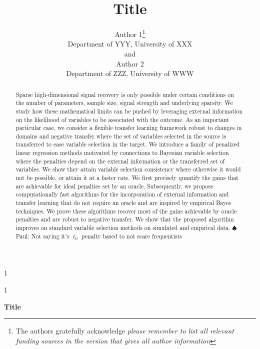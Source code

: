 \documentclass[
  12pt]{article}
\newcommand{\anon}{1}
\newcommand{\paul}[1]{{\small{\color{green} \sf $\spadesuit$ Paul: #1}}}
\begin{document}
\def\spacingset#1{\renewcommand{\baselinestretch}%
{#1}\small\normalsize} \spacingset{1}




\anon
{
  \title{\bf Title}
  \author{Author 1\thanks{
    The authors gratefully acknowledge \textit{please remember to list all relevant funding sources in the version that gives all author information}}\hspace{.2cm}\\
    Department of YYY, University of XXX\\
    and \\
    Author 2 \\
    Department of ZZZ, University of WWW}
  \maketitle
} \fi

\anon
{
  \bigskip
  \bigskip
  \bigskip
  \begin{center}
    {\LARGE\bf Title}
\end{center}
  \medskip
} \fi

\bigskip
\begin{abstract}
Sparse high-dimensional signal recovery is only possible under certain conditions on the number of parameters, sample size, signal strength and underlying sparsity. We study how these mathematical limits can be pushed by leveraging external information on the likelihood of variables to be associated with the outcome. As an important particular case, we consider a flexible transfer learning framework robust to changes in domains and negative transfer where the set of variables selected in the source is transferred to ease variable selection in the target. We introduce a family of penalized linear regression methods motivated by connections to Bayesian variable selection where the penalties depend on the external information or the transferred set of variables. We show they attain variable selection consistency where otherwise it would not be possible, or attain it at a faster rate. We first precisely quantify the gains that are achievable for ideal penalties set by an oracle. Subsequently, we propose computationally fast algorithms for the incorporation of external information and transfer learning that do not require an oracle and are inspired by empirical Bayes techniques. We prove these algorithms recover most of the gains achievable by oracle penalties and are robust to negative transfer. We show that the proposed algorithm improves on standard variable selection methods on simulated and empirical data.\paul{Not saying it's $\ell_0$ penalty based to not scare frequentists}
\end{abstract}
\end{document}
